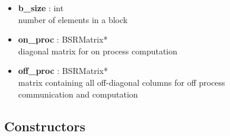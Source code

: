 \documentclass{article}
\newcommand\tab[1][1cm]{\hspace*{#1}}
\begin{document}
\begin{itemize}
    \item \textbf{b\_size} : int \\
        \tab    number of elements in a block
        
    \item \textbf{on\_proc} : BSRMatrix* \\
        \tab    diagonal matrix for on process computation
        
    \item \textbf{off\_proc} : BSRMatrix* \\
        \tab    matrix containing all off-diagonal columns for off process \\
        \tab    communication and computation
\end{itemize}

\subsection*{Constructors}
\end{document}
